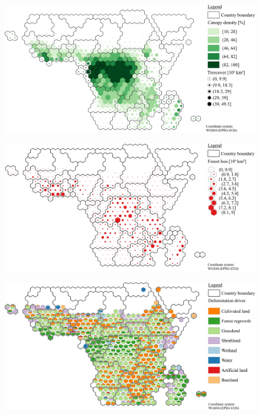 	\begin{figure}[ht]
		\centering
		\includegraphics[scale=1]{img/africa_treecover_frameless}
		\caption[Ecosystem service values]{}
		\label{fig:africacover}
	\end{figure}
	\begin{figure}[ht]
		\centering
		\includegraphics[scale=1]{img/africa_loss_frameless}
		\caption[Ecosystem service values]{}
		\label{fig:africaloss}
	\end{figure}
	\begin{figure}[ht]
		\centering
		\includegraphics[scale=1]{img/africa_driver_frameless}
		\caption[Ecosystem service values]{}
		\label{fig:africadriver}
	\end{figure}


